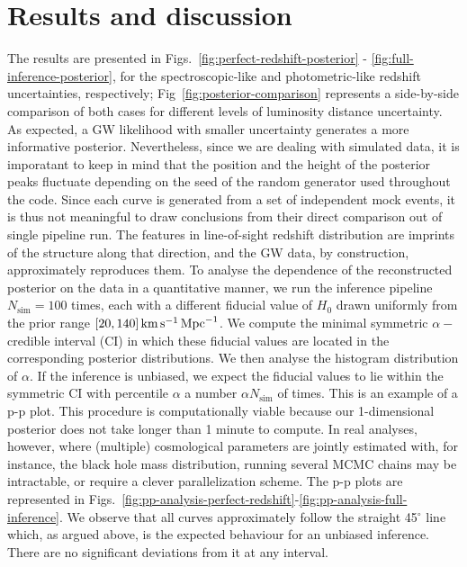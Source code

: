 \documentclass[%
preprint,
nofootinbib,
 amsmath,amssymb,
 aps,
]{revtex4-2}
\newcommand{\rs}[1]{{\color{green}{#1}}}
\begin{document}
\rs{End of suggestions}

\section{Results and discussion}
\label{sec:results}

The results are presented in Figs.~\ref{fig:perfect-redshift-posterior} -
\ref{fig:full-inference-posterior}, for the spectroscopic-like and photometric-like redshift
uncertainties, respectively; Fig~\ref{fig:posterior-comparison} represents a side-by-side
comparison of both cases for different levels of luminosity distance uncertainty. As expected, a GW
likelihood with smaller uncertainty generates a more informative posterior. Nevertheless, since we
are dealing with simulated data, it is imporatant to keep in mind that the position and the height
of the posterior peaks fluctuate depending on the seed of the random generator used throughout the
code. Since each curve is generated from a set of independent mock events, it is thus not
meaningful to draw conclusions from their direct comparison out of single pipeline run. The
features in line-of-sight redshift distribution are imprints of the structure along that direction,
and the GW data, by construction, approximately reproduces them. To analyse the dependence of the
reconstructed posterior on the data in a quantitative manner, we run the inference pipeline
$N_\text{sim} = 100$ times, each with a different fiducial value of $H_0$ drawn uniformly from the
prior range $[20, 140] \, \rm{km} \, \rm{s}^{-1} \, \rm{Mpc}^{-1}$. We compute the minimal
symmetric $\alpha-$credible interval (CI) in which these fiducial values are located in the
corresponding posterior distributions. We then analyse the histogram distribution of $\alpha$. If
the inference is unbiased, we expect the fiducial values to lie within the symmetric CI with
percentile $\alpha$ a number $\alpha N_\text{sim}$ of times. This is an example of a p-p plot. This
procedure is computationally viable because our 1-dimensional posterior does not take longer than 1
minute to compute. In real analyses, however, where (multiple) cosmological parameters are jointly
estimated with, for instance, the black hole mass distribution, running several MCMC chains may be
intractable, or require a clever parallelization scheme. The p-p plots are represented in
Figs.~\ref{fig:pp-analysis-perfect-redshift}-\ref{fig:pp-analysis-full-inference}. We observe that
all curves approximately follow the straight 45$^{\circ}$ line which, as argued above, is the
expected behaviour for an unbiased inference. There are no significant deviations from it at any
interval.
\end{document}
